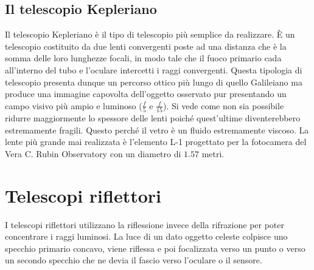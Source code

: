 \documentclass[a4paper, oneside]{book}
\begin{document}
\subsection{Il telescopio Kepleriano}
\begin{figure}
    \centering
\end{figure}
Il telescopio Kepleriano è il tipo di telescopio più semplice da realizzare. È un telescopio 
costituito da due lenti convergenti poste ad una distanza che è la somma delle loro lunghezze focali, in modo tale che
il fuoco primario cada all'interno del tubo e l'oculare intercetti i raggi convergenti.
Questa tipologia di telescopio presenta dunque un percorso ottico più lungo di quello
Galileiano ma produce una immagine capovolta dell'oggetto osservato pur presentando un campo visivo
più ampio e luminoso ($\frac{f}{5}$ e $\frac{f}{15}$). Si vede come non sia possibile ridurre maggiormente lo spessore delle lenti
poiché quest'ultime diventerebbero estremamente fragili. Questo perché il vetro è un fluido estremamente viscoso. La lente più grande
mai realizzata è l'elemento L-1 progettato per la fotocamera del Vera C. Rubin Observatory con un diametro
di $1.57$ metri.

\section{Telescopi riflettori}
I telescopi riflettori utilizzano la riflessione invece della rifrazione per poter 
concentrare i raggi luminosi. La luce di un dato oggetto celeste colpisce uno specchio primario
concavo, viene riflessa e poi focalizzata verso un punto o verso un secondo specchio 
che ne devia il fascio verso l'oculare o il sensore.
\end{document}
